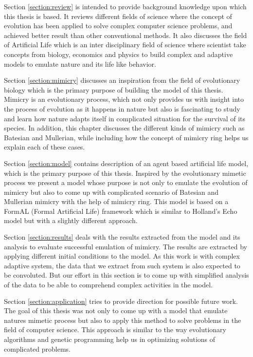 \documentclass[letterpaper]{article}
\numberwithin{equation}{section}
\begin{document}
Section \ref{section:review} is intended to provide background knowledge upon which this thesis is based. It reviews different fields of science where the concept of evolution has been applied to solve complex computer science problems, and achieved better result than other conventional methods. It also discusses the field of Artificial Life which is an inter disciplinary field of science where scientist take concepts from biology, economics and physics to build complex and adaptive models to emulate nature and its life like behavior.

Section \ref{section:mimicry} discusses an inspiration from the field of evolutionary biology which is the primary purpose of building the model of this thesis. Mimicry is an evolutionary process, which not only provides us with insight into the process of evolution as it happens in nature but also is fascinating to study and learn how nature adapts itself in complicated situation for the survival of its species. In addition, this chapter discusses the different kinds of mimicry such as Batesian and Mullerian, while including how the concept of mimicry ring helps us explain each of these cases. 

Section \ref{section:model} contains description of an agent based artificial life model, which is the primary purpose of this thesis. Inspired by the evolutionary mimetic process we present a model whose purpose is not only to emulate the evolution of mimicry but also to come up with complicated scenario of Batesian and Mullerian mimicry with the help of mimicry ring. This model is based on a FormAL (Formal Artificial Life) framework which is similar to Holland's Echo model but with a slightly different approach. 

Section \ref{section:results} deals with the results extracted from the model and its analysis to evaluate successful emulation of mimicry. The results are extracted by applying different initial conditions to the model. As this work is with complex adaptive system, the data that we extract from such system is also expected to be convoluted. But our effort in this section is to come up with simplified analysis of the data to be able to comprehend complex activities in the model. 

Section \ref{section:application} tries to provide direction for possible future work. The goal of this thesis was not only to come up with a model that emulate natures mimetic process but also to apply this method to solve problems in the field of computer science. This approach is similar to the way evolutionary algorithms and genetic programming help us in optimizing solutions of complicated problems. 
\end{document}
